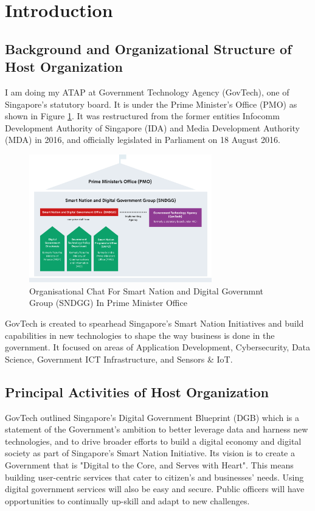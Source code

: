 \section{Introduction}
\subsection{Background and Organizational Structure of Host Organization}
\noindent
I am doing my ATAP at Government Technology Agency (GovTech), one of Singapore's statutory board. It is under the Prime Minister's Office (PMO) as shown in Figure \ref{fig:govtech-role}. It was restructured from the former entities Infocomm Development Authority of Singapore (IDA) and Media Development Authority (MDA) in 2016, and officially legislated in Parliament on 18 August 2016.\cite{REF1:1}
\begin{figure}[h!]
	\begin{center}
		\includegraphics[width=300px]{assets/images/govtech-role.png}
		\caption{Organisational Chat For Smart Nation and Digital Governmnt Group (SNDGG) In Prime Minister Office\cite{REF2:1}}
		\label{fig:govtech-role}
	\end{center}
\end{figure}

\noindent
GovTech is created to spearhead Singapore's Smart Nation Initiatives and build capabilities in new technologies to shape the way business is done in the government. It focused on areas of Application Development, Cybersecurity, Data Science, Government ICT Infrastructure, and Sensors \& IoT.\cite{REF2:1}


\subsection{Principal Activities of Host Organization}
\noindent
GovTech outlined Singapore's Digital Government Blueprint (DGB) which is a statement of the Government's ambition to better leverage data and harness new technologies, and to drive broader efforts to build a digital economy and digital society as part of Singapore's Smart Nation Initiative. Its vision is to create a Government that is "Digital to the Core, and Serves with Heart". This means building user-centric services that cater to citizen's and businesses' needs. Using digital government services will also be easy and secure. Public officers will have opportunities to continually up-skill and adapt to new challenges.\cite{REF3:1}

